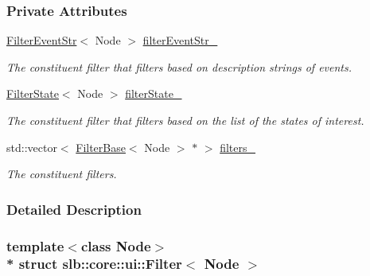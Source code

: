 \subsubsection*{Private Attributes}
\begin{DoxyCompactItemize}
\item 
\hyperlink{structslb_1_1core_1_1ui_1_1FilterEventStr}{Filter\+Event\+Str}$<$ Node $>$ \hyperlink{structslb_1_1core_1_1ui_1_1Filter_a52b9c45741ded8c395ade5838afab4fa}{filter\+Event\+Str\+\_\+}\hypertarget{structslb_1_1core_1_1ui_1_1Filter_a52b9c45741ded8c395ade5838afab4fa}{}\label{structslb_1_1core_1_1ui_1_1Filter_a52b9c45741ded8c395ade5838afab4fa}

\begin{DoxyCompactList}\small\item\em The constituent filter that filters based on description strings of events. \end{DoxyCompactList}\item 
\hyperlink{structslb_1_1core_1_1ui_1_1FilterState}{Filter\+State}$<$ Node $>$ \hyperlink{structslb_1_1core_1_1ui_1_1Filter_a2b8220ef5cd590fa9e3e11b8ce751988}{filter\+State\+\_\+}\hypertarget{structslb_1_1core_1_1ui_1_1Filter_a2b8220ef5cd590fa9e3e11b8ce751988}{}\label{structslb_1_1core_1_1ui_1_1Filter_a2b8220ef5cd590fa9e3e11b8ce751988}

\begin{DoxyCompactList}\small\item\em The constituent filter that filters based on the list of the states of interest. \end{DoxyCompactList}\item 
std\+::vector$<$ \hyperlink{structslb_1_1core_1_1ui_1_1FilterBase}{Filter\+Base}$<$ Node $>$ $\ast$ $>$ \hyperlink{structslb_1_1core_1_1ui_1_1Filter_a95b665853749f2384f67507bd024f771}{filters\+\_\+}\hypertarget{structslb_1_1core_1_1ui_1_1Filter_a95b665853749f2384f67507bd024f771}{}\label{structslb_1_1core_1_1ui_1_1Filter_a95b665853749f2384f67507bd024f771}

\begin{DoxyCompactList}\small\item\em The constituent filters. \end{DoxyCompactList}\end{DoxyCompactItemize}


\subsubsection{Detailed Description}
\subsubsection*{template$<$class Node$>$\\*
struct slb\+::core\+::ui\+::\+Filter$<$ Node $>$}

